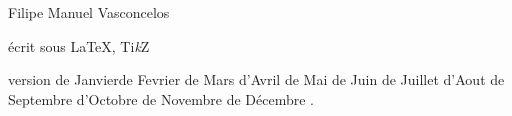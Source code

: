 \vspace*{1cm}
\mbox{}\hfill{}

{\vspace*{3cm}\centerline{\Huge Filipe Manuel Vasconcelos}}

{\small\hbox{}\vfill
\hfill écrit sous \LaTeX, Ti\emph{k}Z

\renewcommand{\today}{\ifcase\month\or de Janvier\or de Fevrier \or de Mars
                                   \or d'Avril   \or de Mai     \or de Juin
                                   \or de Juillet \or d'Aout     \or de Septembre
                                   \or d'Octobre \or de Novembre \or 
                                       de Décembre \fi\number \year}
\hfill version \today.

\hfill 
\doclicenseLongText

\hfill 
\doclicenseImage[imagewidth=10em]
}

